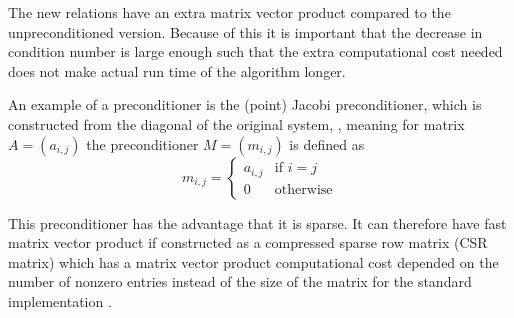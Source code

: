 The new relations have an extra matrix vector product compared to the unpreconditioned version. Because of this it is important that the decrease in condition number is large enough such that the extra computational cost needed does not make actual run time of the algorithm longer.

An example of a preconditioner is the (point) Jacobi preconditioner, which is constructed from the diagonal of the original system, \cite{Barrett96}, meaning for matrix \(A=(a_{i,j})\) the preconditioner \(M=(m_{i,j})\) is defined as
\begin{equation}
    m_{i,j}=\begin{cases}
        a_{i,j}& \text{if } i=j\\
        0 & \text{otherwise}
    \end{cases}
\end{equation}

This preconditioner has the advantage that it is sparse. It can therefore have fast matrix vector product if constructed as a compressed sparse row matrix (CSR matrix) which has a matrix vector product computational cost depended on the number of nonzero entries instead of the size of the matrix for the standard implementation \cite{Bai2000}.